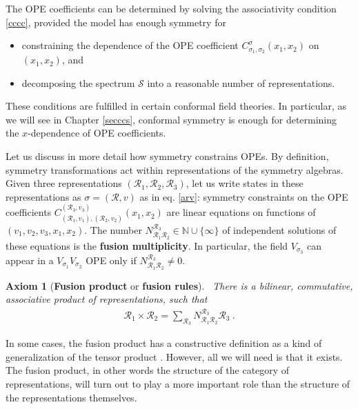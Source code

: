 \documentclass[12pt, a4paper, notitlepage, twoside]{report}
\numberwithin{equation}{section}
\theoremstyle{break}
\newtheorem{hyp}{Axiom}[chapter]
\begin{document}
The OPE coefficients can be determined by solving the associativity condition \eqref{cccc}, provided the model has enough symmetry for 
\begin{itemize}
 \item constraining the dependence of the OPE coefficient $C_{\sigma_1,\sigma_2}^{\sigma}(x_1,x_2)$ on $(x_1,x_2)$, and
\item decomposing the spectrum $\mathcal{S}$ into a reasonable number of representations.
\end{itemize}
These conditions are fulfilled in certain conformal field theories.
In particular, as we will see in Chapter \ref{secccs}, conformal symmetry is enough for determining the $x$-dependence of OPE coefficients. 

Let us discuss in more detail how symmetry constrains OPEs. By definition, symmetry transformations act within representations of the symmetry algebras. Given three representations $(\mathcal{R}_1,\mathcal{R}_2,\mathcal{R}_3)$, let us write states in these representations as $\sigma=(\mathcal{R},v)$ as in eq. \eqref{arv}: symmetry constraints on the OPE coefficients $C_{(\mathcal{R}_1,v_1),(\mathcal{R}_2,v_2)}^{(\mathcal{R}_3,v_3)}(x_1,x_2)$ are linear equations on functions of $(v_1,v_2,v_3,x_1,x_2)$. The number $N_{\mathcal{R}_1\mathcal{R}_2}^{\mathcal{R}_3}\in {\mathbb{N}} \cup \{\infty\}$ of independent solutions of these equations is the \textbf{\boldmath fusion multiplicity}. 
In particular, the field $V_{\sigma_3}$ can appear in a $V_{\sigma_1}V_{\sigma_2}$ OPE only if $N_{\mathcal{R}_1\mathcal{R}_2}^{\mathcal{R}_3}\neq 0$. 

\begin{hyp}[\textbf{\boldmath Fusion product} or \textbf{\boldmath fusion rules}]
 ~\label{ax:fp}
 There is a bilinear, commutative, associative product of representations, such that 
 \begin{align}
 \mathcal{R}_1 \times \mathcal{R}_2  = \sum_{\mathcal{R}_3} N_{\mathcal{R}_1\mathcal{R}_2}^{\mathcal{R}_3} \mathcal{R}_3 \ . 
\label{rrnr}
\end{align}
\end{hyp} 
\noindent
In some cases, the fusion product has a constructive definition as a kind of generalization of the tensor product \cite{gab99, kr18}. However, all we will need is that it exists. The fusion product, in other words the structure of the category of representations, will turn out to play a more important role than the structure of the representations themselves.  
\end{document}
